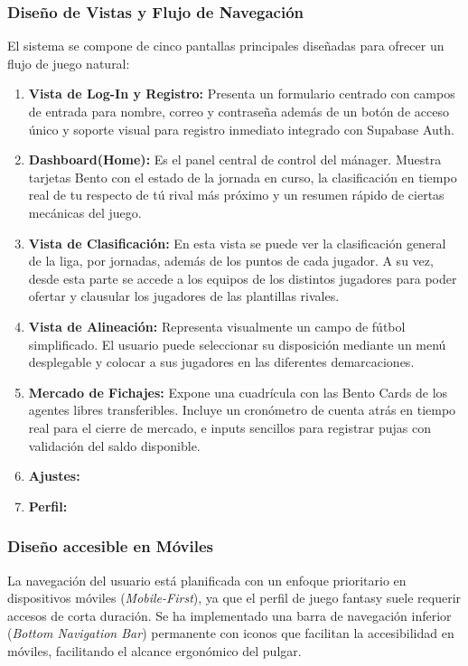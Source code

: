 \subsubsection{Diseño de Vistas y Flujo de Navegación}
El sistema se compone de cinco pantallas principales diseñadas para ofrecer un flujo de juego natural:
\begin{enumerate}
    \item \textbf{Vista de Log-In y Registro:} Presenta un formulario centrado con campos de entrada para nombre, correo y contraseña además de un botón de acceso único y soporte visual para registro inmediato integrado con Supabase Auth.
    \item \textbf{Dashboard(Home):} Es el panel central de control del mánager. Muestra tarjetas Bento con el estado de la jornada en curso, la clasificación en tiempo real de tu respecto de tú rival más próximo y un resumen rápido de ciertas mecánicas del juego.
    \item \textbf{Vista de Clasificación:} En esta vista se puede ver la clasificación general de la liga, por jornadas, además de los puntos de cada jugador. A su vez, desde esta parte se accede a los equipos de los distintos jugadores para poder ofertar y clausular los jugadores de las plantillas rivales.
    \item \textbf{Vista de Alineación:} Representa visualmente un campo de fútbol simplificado. El usuario puede seleccionar su disposición mediante un menú desplegable y colocar a sus jugadores en las diferentes demarcaciones.
    \item \textbf{Mercado de Fichajes:} Expone una cuadrícula con las Bento Cards de los agentes libres transferibles. Incluye un cronómetro de cuenta atrás en tiempo real para el cierre de mercado, e inputs sencillos para registrar pujas con validación del saldo disponible.
    \item \textbf{Ajustes:}
    \item \textbf{Perfil:}
\end{enumerate}

\subsubsection{Diseño accesible en Móviles}
La navegación del usuario está planificada con un enfoque prioritario en dispositivos móviles (\textit{Mobile-First}), ya que el perfil de juego fantasy suele requerir accesos de corta duración. Se ha implementado una barra de navegación inferior (\textit{Bottom Navigation Bar}) permanente con iconos que facilitan la accesibilidad en móviles, facilitando el alcance ergonómico del pulgar.



